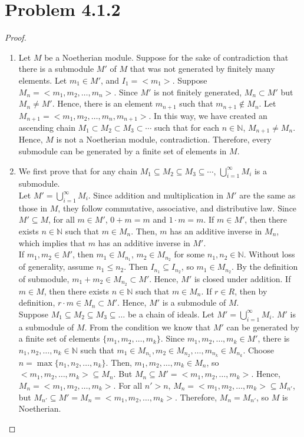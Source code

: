 \documentclass[12pt]{article}
\newcommand{\N}{\mathbb{N}}
\begin{document}
\section{Problem 4.1.2}

\begin{proof}
\begin{enumerate}
    \item Let $M$ be a Noetherian module. Suppose for the sake of contradiction that there is a submodule $M'$ of $M$ that was not generated by finitely many elements. Let $m_1 \in M'$, and $I_1 = <m_1>$. Suppose $M_n = <m_1, m_2, \ldots, m_n>$. Since $M'$ is not finitely generated, $M_n \subset M'$ but $M_n \neq M'$. Hence, there is an element $m_{n+1}$ such that $m_{n+1} \notin M_n$. Let $M_{n+1} = <m_1, m_2, \ldots, m_n, m_{n+1}>$. In this way, we have created an ascending chain $M_1 \subset M_2 \subset M_3 \subset \cdots $ such that for each $n \in \N$, $M_{n+1} \neq M_n$. Hence, $M$ is not a Noetherian module, contradiction. Therefore, every submodule can be generated by a finite set of elements in $M$.
    \item We first prove that for any chain $M_1 \subseteq M_2 \subseteq M_3 \subseteq \cdots$, $\bigcup_{i=1}^\infty M_i$ is a submodule.\\
    
    Let $M' = \bigcup_{i=1}^\infty M_i$. Since addition and multiplication in $M'$ are the same as those in $M$, they follow commutative, associative, and distributive law. Since $M' \subseteq M$, for all $m \in M'$, $0+m=m$ and $1\cdot m = m$. If $m \in M'$, then there exists $n \in \N$ such that $m \in M_n$. Then, $m$ has an additive inverse in $M_n$, which implies that $m$ has an additive inverse in $M'$.\\
    
    If $m_1, m_2 \in M'$, then $m_1 \in M_{n_1}$, $m_2 \in M_{n_2}$ for some $n_1, n_2 \in \N$. Without loss of generality, assume $n_1 \leq n_2$. Then $I_{n_1} \subseteq I_{n_2}$, so $m_1 \in M_{n_2}$. By the definition of submodule, $m_1 + m_2 \in M_{n_2} \subset M'$. Hence, $M'$ is closed under addition. If $m \in M$, then there exists $n \in \N$ such that $m \in M_n$. If $r \in R$, then by definition, $r \cdot m \in M_n \subset M'$. Hence, $M'$ is a submodule of $M$. \\
    
    Suppose $M_1 \subseteq M_2 \subseteq M_3 \subseteq \ldots$ be a chain of ideals. Let $M' = \bigcup_{i=1}^\infty M_i$. $M'$ is a submodule of $M$. From the condition we know that $M'$ can be generated by a finite set of elements $\{m_1, m_2, \ldots, m_k\}$. Since $m_1, m_2, \ldots, m_k \in M'$, there is $n_1, n_2, \ldots, n_k \in \N$ such that $m_1 \in M_{n_1}, m_2 \in M_{n_2}, \ldots, m_{n_k} \in M_{n_k}$. Choose $n = \max \{n_1, n_2, \ldots, n_k\}$. Then, $m_1, m_2, \ldots, m_k \in M_n$, so $<m_1, m_2, \ldots, m_k> \subseteq M_n$. But $M_n \subseteq M' = <m_1, m_2, \ldots, m_k>$. Hence, $M_n = <m_1, m_2, \ldots, m_k>$. For all $n' > n $, $M_n = <m_1, m_2, \ldots, m_k> \subseteq M_{n'}$, but $M_{n'} \subseteq M' = M_n = <m_1, m_2, \ldots, m_k>$. Therefore, $M_n = M_{n'}$, so $M$ is Noetherian.
\end{enumerate}

\end{proof}
\end{document}

